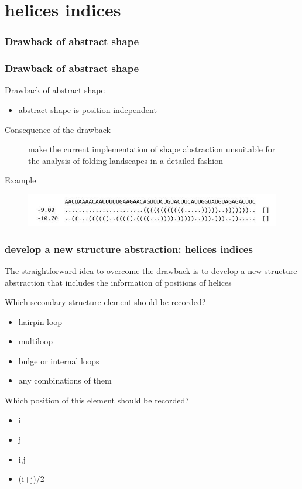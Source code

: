 \documentclass[ignorenonframetext,10pt]{beamer}
\begin{document}
\section{helices indices}
\frametitle{Drawback of abstract shape}
\begin{frame}
\frametitle{Drawback of abstract shape}
   \begin{block}{\small Drawback of abstract shape}
   \begin{itemize} 
   \item abstract shape is position independent
   \end{itemize}
   \end{block}
   \begin{block}{\small Consequence of the drawback}
   \begin{figure}
     \item make the current implementation of shape abstraction unsuitable for the analysis of folding landscapes in a detailed fashion
   \end{figure}
   \end{block}  
   \begin{block}{\small Example}
   \begin{figure}
     \includegraphics[scale=0.55]{images/drawback_1.jpg} 
   \end{figure}
   \end{block}      
\end{frame}


\begin{frame}
\frametitle{develop a new structure abstraction: helices indices}
    The straightforward idea to overcome the drawback is to develop a new structure abstraction that includes the information of positions of helices
    \begin{block}{Which secondary structure element should be recorded?}
    \begin{itemize} 
    \item hairpin loop
    \item multiloop
    \item bulge or internal loops
    \item any combinations of them
    \end{itemize}
    \end{block}
    \begin{block}{Which position of this element should be recorded?}
    \begin{itemize} 
    \item i
    \item j   
    \item i,j
    \item (i+j)/2
    \end{itemize}    
    \end{block}
\end{frame}
\end{document}
